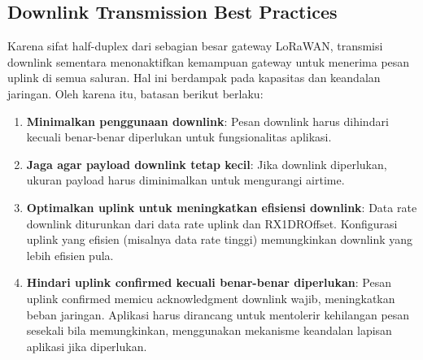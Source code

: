 \subsection{Downlink Transmission Best Practices}
Karena sifat half-duplex dari sebagian besar gateway LoRaWAN, transmisi downlink sementara menonaktifkan kemampuan gateway untuk menerima pesan uplink di semua saluran. Hal ini berdampak pada kapasitas dan keandalan jaringan. Oleh karena itu, batasan berikut berlaku:
\begin{enumerate}
    \item \textbf{Minimalkan penggunaan downlink}: Pesan downlink harus dihindari kecuali benar-benar diperlukan untuk fungsionalitas aplikasi.
    \item \textbf{Jaga agar payload downlink tetap kecil}: Jika downlink diperlukan, ukuran payload harus diminimalkan untuk mengurangi airtime.
    \item \textbf{Optimalkan uplink untuk meningkatkan efisiensi downlink}: Data rate downlink diturunkan dari data rate uplink dan RX1DROffset. Konfigurasi uplink yang efisien (misalnya data rate tinggi) memungkinkan downlink yang lebih efisien pula.
    \item \textbf{Hindari uplink confirmed kecuali benar-benar diperlukan}: Pesan uplink confirmed memicu acknowledgment downlink wajib, meningkatkan beban jaringan. Aplikasi harus dirancang untuk mentolerir kehilangan pesan sesekali bila memungkinkan, menggunakan mekanisme keandalan lapisan aplikasi jika diperlukan.
\end{enumerate}